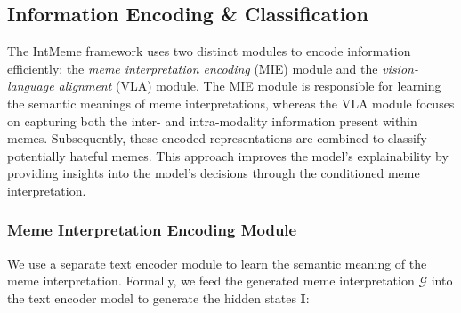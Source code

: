 \subsection{Information Encoding \& Classification}
The IntMeme framework uses two distinct modules to encode information efficiently: the \textsl{meme interpretation encoding} (MIE) module and the \textsl{vision-language alignment} (VLA) module. The MIE module is responsible for learning the semantic meanings of meme interpretations, whereas the VLA module focuses on capturing both the inter- and intra-modality information present within memes. Subsequently, these encoded representations are combined to classify potentially hateful memes. This approach improves the model's explainability by providing insights into the model's decisions through the conditioned meme interpretation.

\subsubsection{Meme Interpretation Encoding Module}
We use a separate text encoder module to learn the semantic meaning of the meme interpretation. Formally, we feed the generated meme interpretation $\mathcal{G}$ into the text encoder model to generate the hidden states $\mathbf{I}$:

